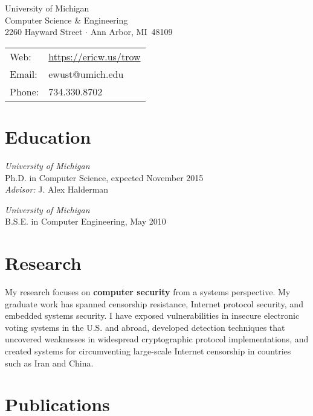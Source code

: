 \documentclass[margin,11pt]{res} %
\begin{document}
\begin{adjustwidth}{-1.3in}{0pt}
\vspace{20pt}

\noindent 
\parbox[m]{4in}{
University of Michigan\\
Computer Science \& Engineering\\
2260 Hayward Street $\cdot$ Ann Arbor, MI \,48109
}
\begin{tabular}{ll}
{Web}:&\url{https://ericw.us/trow}\\
{Email}:&ewust@umich.edu\\
{Phone}:& 734.330.8702
\end{tabular}
\vspace{10pt}
\end{adjustwidth}

\section{\large Education}

        \emph{University of Michigan}\\
        Ph.D. in Computer Science, expected November 2015\\
        \emph{Advisor:} J. Alex Halderman

        \emph{University of Michigan}\\
        B.S.E. in Computer Engineering, May 2010

\vspace{6pt}
\section{\large Research}

My research focuses on \textbf{computer security} from a systems perspective. My graduate work has spanned censorship resistance, Internet protocol security, and embedded systems security.
I have exposed vulnerabilities in insecure electronic voting systems in the U.S. and abroad, developed detection techniques that uncovered weaknesses in widespread cryptographic protocol implementations, and created systems for circumventing large-scale Internet censorship in countries such as Iran and China.

\vspace{6pt}
\section{\large Publications}
\end{document}
